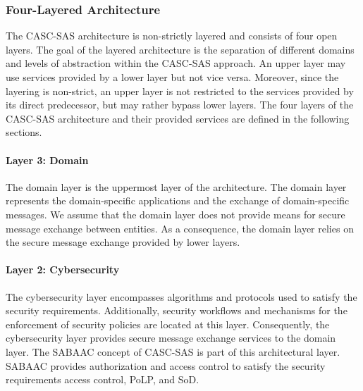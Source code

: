 \subsubsection{Four-Layered Architecture}
\label{sec:approach:casc:architecture:layers}
The CASC-SAS architecture is non-strictly layered and consists of four open layers.
The goal of the layered architecture is the separation of different domains and levels of abstraction within the CASC-SAS approach.
An upper layer may use services provided by a lower layer but not vice versa.
Moreover, since the layering is non-strict, an upper layer is not restricted to the services provided by its direct predecessor, but may rather bypass lower layers.
The four layers of the CASC-SAS architecture and their provided services are defined in the following sections.

\paragraph{Layer 3: Domain}
The domain layer is the uppermost layer of the architecture.
The domain layer represents the domain-specific applications and the exchange of domain-specific messages.
We assume that the domain layer does not provide means for secure message exchange between entities.
As a consequence, the domain layer relies on the secure message exchange provided by lower layers.

\paragraph{Layer 2: Cybersecurity}
The cybersecurity layer encompasses algorithms and protocols used to satisfy the security requirements.
Additionally, security workflows and mechanisms for the enforcement of security policies are located at this layer.
Consequently, the cybersecurity layer provides secure message exchange services to the domain layer.
The SABAAC concept of CASC-SAS is part of this architectural layer.
SABAAC provides authorization and access control to satisfy the security requirements access control, PoLP, and SoD.

